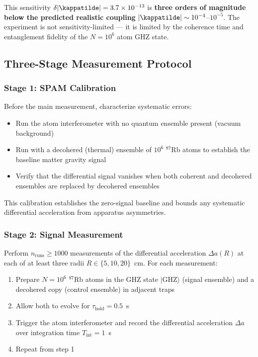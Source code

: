 \noindent This sensitivity $\delta|\kappatilde| = 3.7\times10^{-13}$ is
\textbf{three orders of magnitude below the predicted realistic coupling}
$|\kappatilde| \sim 10^{-4}$--$10^{-5}$. The experiment is not
sensitivity-limited --- it is limited by the coherence time and
entanglement fidelity of the $N = 10^6$ atom GHZ state.

\subsection{Three-Stage Measurement Protocol}
\label{subsec:protocol}

\subsubsection{Stage 1: SPAM Calibration}

Before the main measurement, characterize systematic errors:
\begin{itemize}
    \item Run the atom interferometer with no quantum ensemble present
    (vacuum background)
    \item Run with a decohered (thermal) ensemble of $10^6$ $^{87}$Rb
    atoms to establish the baseline matter gravity signal
    \item Verify that the differential signal vanishes when both
    coherent and decohered ensembles are replaced by decohered ensembles
\end{itemize}

This calibration establishes the zero-signal baseline and bounds any
systematic differential acceleration from apparatus asymmetries.

\subsubsection{Stage 2: Signal Measurement}

Perform $n_{\mathrm{runs}} \geq 1000$ measurements of the differential
acceleration $\Delta a(R)$ at each of at least three radii
$R \in \{5, 10, 20\}$~cm. For each measurement:

\begin{enumerate}
    \item Prepare $N = 10^6$ $^{87}$Rb atoms in the GHZ state
    $|\mathrm{GHZ}\rangle$ (signal ensemble) and a decohered copy
    (control ensemble) in adjacent traps
    \item Allow both to evolve for $\tau_{\mathrm{hold}} = 0.5$~s
    \item Trigger the atom interferometer and record the differential
    acceleration $\Delta a$ over integration time $T_{\mathrm{int}} = 1$~s
    \item Repeat from step 1
\end{enumerate}

